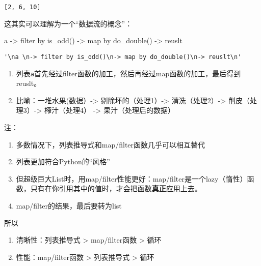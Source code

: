 \documentclass[
  letterpaper,
  DIV=11,
  numbers=noendperiod]{scrreprt}
\newenvironment{Shaded}{\begin{snugshade}}{\end{snugshade}}
\newcommand{\CommentTok}[1]{\textcolor[rgb]{0.37,0.37,0.37}{#1}}
\providecommand{\tightlist}{%
  \setlength{\itemsep}{0pt}\setlength{\parskip}{0pt}}\usepackage{longtable,booktabs,array}
\begin{document}
\begin{verbatim}
[2, 6, 10]
\end{verbatim}

这其实可以理解为一个``数据流的概念''：

\begin{Shaded}
\begin{Highlighting}[]
\CommentTok{\textquotesingle{}\textquotesingle{}\textquotesingle{}}
\CommentTok{a }
\CommentTok{{-}\textgreater{} filter by is\_odd()}
\CommentTok{{-}\textgreater{} map by do\_double()}
\CommentTok{{-}\textgreater{} reuslt}
\CommentTok{\textquotesingle{}\textquotesingle{}\textquotesingle{}}
\end{Highlighting}
\end{Shaded}

\begin{verbatim}
'\na \n-> filter by is_odd()\n-> map by do_double()\n-> reuslt\n'
\end{verbatim}

\begin{enumerate}
\def\labelenumi{\arabic{enumi}.}
\tightlist
\item
  列表\texttt{a}首先经过filter函数的加工，然后再经过map函数的加工，最后得到reuslt。
\item
  比喻：一堆水果(数据）-\textgreater{} 剔除坏的（处理1）-\textgreater{}
  清洗（处理2）-\textgreater{} 削皮（处理3）-\textgreater{}
  榨汁（处理4） -\textgreater{} 果汁（处理后的数据）
\end{enumerate}

注：

\begin{enumerate}
\def\labelenumi{\arabic{enumi}.}
\tightlist
\item
  多数情况下，列表推导式和map/filter函数几乎可以相互替代
\item
  列表更加符合Python的``风格''
\item
  但超级巨大List时，用map/filter性能更好：map/filter是一个lazy（惰性）函数，只有在你引用其中的值时，才会把函数\textbf{真正}应用上去。
\item
  map/filter的结果，最后要转为list
\end{enumerate}

所以

\begin{enumerate}
\def\labelenumi{\arabic{enumi}.}
\tightlist
\item
  清晰性：列表推导式 \textgreater{} map/filter函数 \textgreater{} 循环
\item
  性能：map/filter函数 \textgreater{} 列表推导式 \textgreater{} 循环
\end{enumerate}
\end{document}
